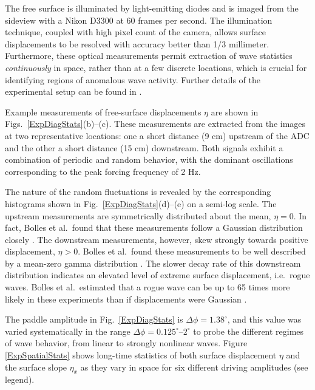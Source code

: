 \documentclass[11pt]{article}
\newcommand{\Dphi}{\Delta \phi}
\begin{document}
	The free surface is illuminated by light-emitting diodes and is imaged from the sideview with a Nikon D3300 at 60 frames per second. The illumination technique, coupled with high pixel count of the camera, allows surface displacements to be resolved with accuracy better than 1/3 millimeter. Furthermore, these optical measurements permit extraction of wave statistics {\em continuously} in space, rather than at a few discrete locations, which is crucial for identifying regions of anomalous wave activity. Further details of the experimental setup can be found in \cite{bolles2019}.

	Example measurements of free-surface displacements $\eta$ are shown in Figs.~\ref{ExpDiagStats}(b)--(c). These measurements are extracted from the images at two representative locations: one a short distance (9 cm) upstream of the ADC and the other a short distance (15 cm) downstream. Both signals exhibit a combination of periodic and random behavior, with the dominant oscillations corresponding to the peak forcing frequency of 2 Hz. 
	
	The nature of the random fluctuations is revealed by the corresponding histograms shown in Fig.~\ref{ExpDiagStats}(d)--(e) on a semi-log scale. The upstream measurements are symmetrically distributed about the mean, $\eta = 0$. In fact, Bolles et al.~found that these measurements follow a Gaussian distribution closely \cite{bolles2019}. The downstream measurements, however, skew strongly towards positive displacement, $\eta > 0$. Bolles et al.~found these measurements to be well described by a mean-zero gamma distribution \cite{bolles2019}. The slower decay rate of this downstream distribution indicates an elevated level of extreme surface displacement, i.e.~rogue waves. Bolles et al.~estimated that a rogue wave can be up to 65 times more likely in these experiments than if displacements were Gaussian \cite{bolles2019}. 
 
	The paddle amplitude in Fig.~\ref{ExpDiagStats} is $\Dphi = 1.38^{\circ}$, and this value was varied systematically in the range $\Dphi = 0.125^{\circ}$--$2^{\circ}$ to probe the different regimes of wave behavior, from linear to strongly nonlinear waves. Figure \ref{ExpSpatialStats} shows long-time statistics of both surface displacement $\eta$ and the surface slope $\eta_x$ as they vary in space for six different driving amplitudes (see legend). 
 
\end{document}
